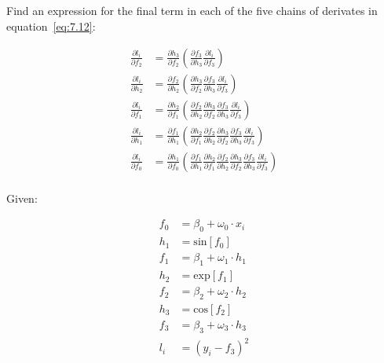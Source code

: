 \documentclass[12pt]{report}
\begin{document}
\subsection{}
\begin{mdframed}
    Find an expression for the final term in each of the five chains of derivates in equation~\ref{eq:7.12}:

    \begin{align*}
        \frac{\partial l_{i}}{\partial f_{2}} & = \frac{\partial h_{3}}{\partial f_{2}}\left(\frac{\partial f_{3}}{\partial h_{3}}\frac{\partial l_{i}}{\partial f_{3}}\right)                                                                                                                                                     \\
        \frac{\partial l_{i}}{\partial h_{2}} & = \frac{\partial f_{2}}{\partial h_{2}}\left(\frac{\partial h_{3}}{\partial f_{2}}\frac{\partial f_{3}}{\partial h_{3}}\frac{\partial l_{i}}{\partial f_{3}}\right)                                                                                                                \\
        \frac{\partial l_{i}}{\partial f_{1}} & = \frac{\partial h_{2}}{\partial f_{1}}\left(\frac{\partial f_{2}}{\partial h_{2}}\frac{\partial h_{3}}{\partial f_{2}}\frac{\partial f_{3}}{\partial h_{3}}\frac{\partial l_{i}}{\partial f_{3}}\right)                                                                           \\
        \frac{\partial l_{i}}{\partial h_{1}} & = \frac{\partial f_{1}}{\partial h_{1}}\left(\frac{\partial h_{2}}{\partial f_{1}}\frac{\partial f_{2}}{\partial h_{2}}\frac{\partial h_{3}}{\partial f_{2}}\frac{\partial f_{3}}{\partial h_{3}}\frac{\partial l_{i}}{\partial f_{3}}\right)                                      \\
        \frac{\partial l_{i}}{\partial f_{0}} & = \frac{\partial h_{1}}{\partial f_{0}}\left(\frac{\partial f_{1}}{\partial h_{1}}\frac{\partial h_{2}}{\partial f_{1}}\frac{\partial f_{2}}{\partial h_{2}}\frac{\partial h_{3}}{\partial f_{2}}\frac{\partial f_{3}}{\partial h_{3}}\frac{\partial l_{i}}{\partial f_{3}}\right) \\
        \tag{7.12}
        \label{eq:7.12}
    \end{align*}
\end{mdframed}

Given:

\begin{align*}
    f_{0} & = \beta_{0} + \omega_{0}\cdot x_{i} \\
    h_{1} & = \text{sin}[f_{0}]                 \\
    f_{1} & = \beta_{1} + \omega_{1}\cdot h_{1} \\
    h_{2} & = \text{exp}[f_{1}]                 \\
    f_{2} & = \beta_{2} + \omega_{2}\cdot h_{2} \\
    h_{3} & = \text{cos}[f_{2}]                 \\
    f_{3} & = \beta_{3} + \omega_{3}\cdot h_{3} \\
    l_{i} & = (y_{i} - f_{3})^{2}
\end{align*}
\end{document}
